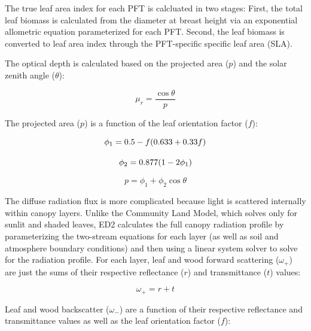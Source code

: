 
The true leaf area index for each PFT is calcluated in two stages:
First, the total leaf biomass is calculated from the diameter at breast height via an exponential allometric equation parameterized for each PFT\@.
Second, the leaf biomass is converted to leaf area index through the PFT-specific specific leaf area (SLA).

The optical depth is calculated based on the projected area ($p$) and the solar zenith angle ($\theta$):

\begin{equation}
  \mu_r = \frac{\cos{\theta}}{p}
\end{equation}

The projected area ($p$) is a function of the leaf orientation factor ($f$):

\begin{equation}\label{eq:phi1}
  \phi_1 = 0.5 - f (0.633 + 0.33 f) \\
\end{equation}

\begin{equation}\label{eq:phi2}
  \phi_2 = 0.877 (1 - 2 \phi_1) \\
\end{equation}

\begin{equation}
  p = \phi_1 + \phi_2 \cos{\theta} 
\end{equation}


The diffuse radiation flux is more complicated because light is scattered internally within canopy layers.
Unlike the Community Land Model, which solves only for sunlit and shaded leaves,
ED2 calculates the full canopy radiation profile by parameterizing the two-stream equations for each layer (as well as soil and atmosphere boundary conditions)
and then using a linear system solver to solve for the radiation profile.
For each layer, leaf and wood forward scattering ($\omega_+$) are just the sums of their respective reflectance ($r$) and transmittance ($t$) values:

\begin{equation}
   \omega_+ = r + t 
\end{equation}

Leaf and wood backscatter ($\omega_-$) are a function of their respective reflectance and transmittance values as well as the leaf orientation factor ($f$):

